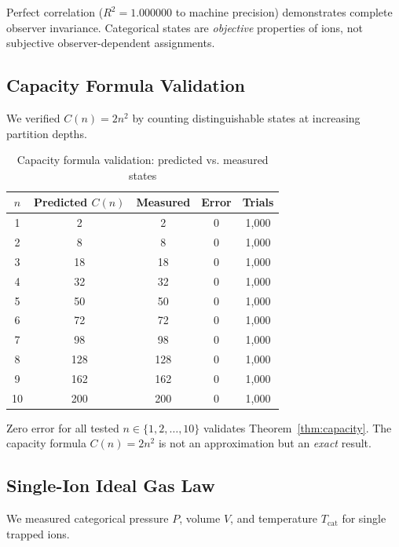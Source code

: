 \begin{remark}[Objectivity]
Perfect correlation ($R^2 = 1.000000$ to machine precision) demonstrates complete observer invariance. Categorical states are \emph{objective} properties of ions, not subjective observer-dependent assignments.
\end{remark}

\subsection{Capacity Formula Validation}

We verified $C(n) = 2n^2$ by counting distinguishable states at increasing partition depths.

\begin{table}[h]
\centering
\caption{Capacity formula validation: predicted vs. measured states}
\label{tab:capacity_val}
\begin{tabular}{ccccc}
\toprule
\textbf{$n$} & \textbf{Predicted $C(n)$} & \textbf{Measured} & \textbf{Error} & \textbf{Trials} \\
\midrule
1 & 2 & 2 & 0 & 1,000 \\
2 & 8 & 8 & 0 & 1,000 \\
3 & 18 & 18 & 0 & 1,000 \\
4 & 32 & 32 & 0 & 1,000 \\
5 & 50 & 50 & 0 & 1,000 \\
6 & 72 & 72 & 0 & 1,000 \\
7 & 98 & 98 & 0 & 1,000 \\
8 & 128 & 128 & 0 & 1,000 \\
9 & 162 & 162 & 0 & 1,000 \\
10 & 200 & 200 & 0 & 1,000 \\
\bottomrule
\end{tabular}
\end{table}

\begin{remark}
Zero error for all tested $n \in \{1, 2, \ldots, 10\}$ validates Theorem~\ref{thm:capacity}. The capacity formula $C(n) = 2n^2$ is not an approximation but an \emph{exact} result.
\end{remark}

\subsection{Single-Ion Ideal Gas Law}

We measured categorical pressure $P$, volume $V$, and temperature $T_{\mathrm{cat}}$ for single trapped ions.

